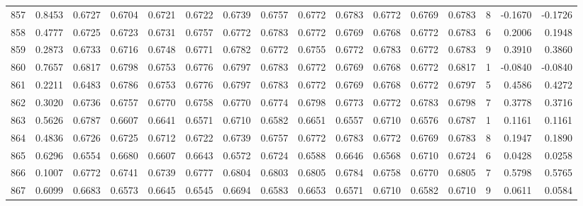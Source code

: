 \begin{tabular}{lrrrrrrrrrrrrrrr}
857 &      0.8453 &  0.6727 &  0.6704 &  0.6721 &  0.6722 &  0.6739 &  0.6757 &  0.6772 &  0.6783 &  0.6772 &   0.6769 &     0.6783 &      8 &                   -0.1670 &                    -0.1726 \\
858 &      0.4777 &  0.6725 &  0.6723 &  0.6731 &  0.6757 &  0.6772 &  0.6783 &  0.6772 &  0.6769 &  0.6768 &   0.6772 &     0.6783 &      6 &                    0.2006 &                     0.1948 \\
859 &      0.2873 &  0.6733 &  0.6716 &  0.6748 &  0.6771 &  0.6782 &  0.6772 &  0.6755 &  0.6772 &  0.6783 &   0.6772 &     0.6783 &      9 &                    0.3910 &                     0.3860 \\
860 &      0.7657 &  0.6817 &  0.6798 &  0.6753 &  0.6776 &  0.6797 &  0.6783 &  0.6772 &  0.6769 &  0.6768 &   0.6772 &     0.6817 &      1 &                   -0.0840 &                    -0.0840 \\
861 &      0.2211 &  0.6483 &  0.6786 &  0.6753 &  0.6776 &  0.6797 &  0.6783 &  0.6772 &  0.6769 &  0.6768 &   0.6772 &     0.6797 &      5 &                    0.4586 &                     0.4272 \\
862 &      0.3020 &  0.6736 &  0.6757 &  0.6770 &  0.6758 &  0.6770 &  0.6774 &  0.6798 &  0.6773 &  0.6772 &   0.6783 &     0.6798 &      7 &                    0.3778 &                     0.3716 \\
863 &      0.5626 &  0.6787 &  0.6607 &  0.6641 &  0.6571 &  0.6710 &  0.6582 &  0.6651 &  0.6557 &  0.6710 &   0.6576 &     0.6787 &      1 &                    0.1161 &                     0.1161 \\
864 &      0.4836 &  0.6726 &  0.6725 &  0.6712 &  0.6722 &  0.6739 &  0.6757 &  0.6772 &  0.6783 &  0.6772 &   0.6769 &     0.6783 &      8 &                    0.1947 &                     0.1890 \\
865 &      0.6296 &  0.6554 &  0.6680 &  0.6607 &  0.6643 &  0.6572 &  0.6724 &  0.6588 &  0.6646 &  0.6568 &   0.6710 &     0.6724 &      6 &                    0.0428 &                     0.0258 \\
866 &      0.1007 &  0.6772 &  0.6741 &  0.6739 &  0.6777 &  0.6804 &  0.6803 &  0.6805 &  0.6784 &  0.6758 &   0.6770 &     0.6805 &      7 &                    0.5798 &                     0.5765 \\
867 &      0.6099 &  0.6683 &  0.6573 &  0.6645 &  0.6545 &  0.6694 &  0.6583 &  0.6653 &  0.6571 &  0.6710 &   0.6582 &     0.6710 &      9 &                    0.0611 &                     0.0584 \\

\end{tabular}

